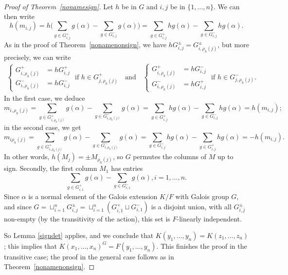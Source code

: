 \documentclass[12pt]{article}
\theoremstyle{plain}
\begin{document}
\begin{proof}[Proof of Theorem~\ref{nonamesign}]
Let $h$ be in $G$
and  $i,j$ be in $\lbrace 1, \ldots, n \rbrace$. We 
can then write
$$h(m_{i,j}) = h\Big( \sum_{g\in G^{+}_{i,j}}g(\alpha) -\sum_{g\in
  G^{-}_{i,j}}g(\alpha)\Big) = \sum_{g\in G^{+}_{i,j}}hg(\alpha)
-\sum_{g\in G^{-}_{i,j}}hg(\alpha).$$ 
As in the proof of Theorem~\ref{nonamenonsign}, we have
$hG^{\pm}_{i,j} = G^{\pm}_{i,\rho_h(j)}$, but more precisely, we can write
\begin{align}
\left \{
\begin{array}{ll}
  G^{+}_{i,\rho_{h}(j)}&= hG^{+}_{i,j}\\
G^{-}_{i,\rho_h(j)}&= hG^{-}_{i,j}
\end{array}\right .
\text{~if~} h \in G^+_{j,\rho_h(j)}
\quad\text{and}\quad
\left \{
\begin{array}{cl}
  G^{+}_{i,\rho_{h}(j)}&= hG^{-}_{i,j}\\
G^{-}_{i,\rho_h(j)}&= hG^{+}_{i,j}
\end{array}\right .
\text{~if~} h \in G^-_{j,\rho_h(j)}.
\end{align}
In the first case, we deduce
$$m_{i,\rho_h(j)} =  \sum_{g\in G^{+}_{i,\rho_h(j)}}g(\alpha) -\sum_{g\in G^{-}_{i,\rho_h(j)}}g(\alpha) 
                  =  \sum_{g\in G^{+}_{i,j}}hg(\alpha) -\sum_{g\in G^{-}_{i,j}}hg(\alpha)
=h(m_{i,j});$$
in the second case, we get
$$m_{i\rho_h(j)} = \sum_{g\in G^{+}_{i,\rho_h(j)}}g(\alpha)
-\sum_{g\in G^{-}_{i,\rho_h(j)}}g(\alpha) = \sum_{g\in
  G^{-}_{i,j}}hg(\alpha) -\sum_{g\in
  G^{+}_{i,j}}hg(\alpha)=-h(m_{i,j}).$$ In other words, $h(M_j) = \pm
M_{\rho_h(j)}$, so $G$ permutes the columns of $M$ up to sign.
Secondly, the first column $M_1$ has entries 
$$\sum_{g \in G^{+}_{i,1}}g(\alpha)- \sum_{g \in
  G^{-}_{i,1}}g(\alpha), i = 1, \ldots,n.$$ Since $\alpha$ is a normal
element of the Galois extension $K/F$ with Galois group $G$, and since
$G = \sqcup^n_{i =1}G^{\pm}_{i,j}= \sqcup^n_{i =1}(G^{+}_{i,1} \sqcup
G^{-}_{i,1}) $ is a disjoint union, with all $G^{\pm}_{i,j}$ non-empty (by
the transitivity of the action), this set is $F$-linearly independent.

So Lemma \ref{signdet} applies, and we conclude that $K(y_1, \ldots,
y_n)=K(z_1,\dots,z_n)$; this implies that
$K(x_1,\dots,x_n)^G=F(y_1,\dots,y_n)$.  This finishes the proof in the
transitive case; the proof in the general case follows as in
Theorem~\ref{nonamenonsign}.
\end{proof}
\end{document}
